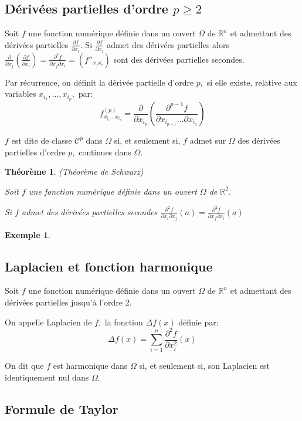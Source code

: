 \documentclass[11pt,a4paper]{report}
\newtheorem{theorem}{Théorème}[section]
\newtheorem{ex}{Exemple}[section]
\begin{document}
\subsection{Dérivées partielles d'ordre $p\geq 2$}

Soit $f$ une fonction numérique définie dans un ouvert $\Omega$ de $\mathbb{R}^n$ et admettant des dérivées partielles $\frac{\partial f}{\partial x_i}.$ Si $\frac{\partial f}{\partial x_i}$ admet des dérivées partielles alors $\frac{\partial }{\partial x_j}(\frac{\partial f}{\partial x_i})=\frac{\partial^2 f}{\partial x_j \partial x_i}=(f''_{x_j x_i})$ sont des dérivées partielles secondes.

Par récurrence, on définit la dérivée partielle d'ordre $p,$ si elle existe, relative aux variables $x_{i_1},...,x_{i_p},$ par:
$$f_{x_{i_1}...x_{i_p}}^{(p)}=\frac{\partial }{\partial x_{i_p}}(\frac{\partial^{p-1}f}{\partial x_{i_{p-1}}...\partial x_{i_1}})$$

$f$ est dite de classe $\mathscr{C}^p$ dans $\Omega$ si, et seulement si, $f$ admet sur $\Omega$ des dérivées partielles d'ordre $p,$ continues dans $\Omega.$
\begin{theorem} (Théorème de Schwarz)

Soit $f$ une fonction numérique définie dans un ouvert $\Omega$ de $\mathbb{R}^2.$

Si $f$ admet des dérivées partielles secondes $\frac{\partial^2 f}{\partial x_i \partial x_j}(a)=\frac{\partial^2 f}{\partial x_j \partial x_i}(a)$
\end{theorem}

\begin{ex}
\end{ex}
\subsection{Laplacien et fonction harmonique}

Soit $f$ une fonction numérique définie dans un ouvert $\Omega$ de $\mathbb{R}^n$ et admettant des dérivées partielles jusqu'à l'ordre 2.

On appelle Laplacien de $f,$ la fonction $\Delta f(x)$ définie par:
$$\Delta f(x)=\sum_{i=1}^{n}\frac{\partial^2 f}{\partial x_{i}^{2}}(x)$$

On dit que $f$ est harmonique dans $\Omega$ si, et seulement si, son Laplacien est identiquement nul dans $\Omega.$
\subsection{Formule de Taylor}
\end{document}
